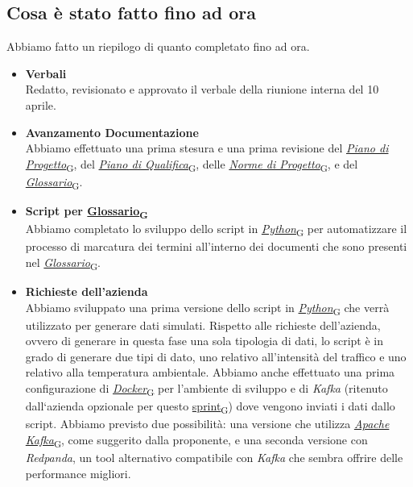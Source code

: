 \documentclass[italian,12pt]{article}
\begin{document}
\subsection{Cosa è stato fatto fino ad ora}
Abbiamo fatto un riepilogo di quanto completato fino ad ora.
\begin{itemize}
	\item \textbf{Verbali} \\
	Redatto, revisionato e approvato il verbale della riunione interna del 10 aprile.
	\item \textbf{Avanzamento Documentazione} \\
	Abbiamo effettuato una prima stesura e una prima revisione del \href{https://7last.github.io/docs/rtb/documentazione-interna/glossario\#piano-di-progetto}{\textit{Piano di Progetto}\textsubscript{G}}, del \href{https://7last.github.io/docs/rtb/documentazione-interna/glossario\#piano-di-qualifica}{\textit{Piano di Qualifica}\textsubscript{G}}, delle \href{https://7last.github.io/docs/rtb/documentazione-interna/glossario\#norme-di-progetto}{\textit{Norme di Progetto}\textsubscript{G}}, e del \href{https://7last.github.io/docs/rtb/documentazione-interna/glossario\#glossario}{\textit{Glossario}\textsubscript{G}}.
	\item \textbf{Script per \href{https://7last.github.io/docs/rtb/documentazione-interna/glossario\#glossario}{Glossario\textsubscript{G}}} \\
	Abbiamo completato lo sviluppo dello script in \href{https://7last.github.io/docs/rtb/documentazione-interna/glossario#python}{\textit{Python}\textsubscript{G}} per automatizzare il processo di marcatura dei termini all'interno dei documenti che sono presenti nel \href{https://7last.github.io/docs/rtb/documentazione-interna/glossario\#glossario}{\textit{Glossario}\textsubscript{G}}.
	\item \textbf{Richieste dell'azienda} \\
	Abbiamo sviluppato una prima versione dello script in \href{https://7last.github.io/docs/rtb/documentazione-interna/glossario#python}{\textit{Python}\textsubscript{G}} che verrà utilizzato per generare dati simulati. Rispetto alle richieste dell'azienda, ovvero di generare in questa fase una sola tipologia di dati, lo script è in grado di generare due tipi di dato, uno relativo all'intensità del traffico e uno relativo alla temperatura ambientale. Abbiamo anche effettuato una prima configurazione di \href{https://7last.github.io/docs/rtb/documentazione-interna/glossario#docker}{\textit{Docker}\textsubscript{G}} per l'ambiente di sviluppo e di \textit{Kafka} (ritenuto dall`azienda opzionale per questo \href{https://7last.github.io/docs/rtb/documentazione-interna/glossario#sprint}{sprint\textsubscript{G}}) dove vengono inviati i dati dallo script. Abbiamo previsto due possibilità: una versione che utilizza \href{https://7last.github.io/docs/rtb/documentazione-interna/glossario#apache-kafka}{\textit{Apache Kafka}\textsubscript{G}}, come suggerito dalla proponente, e una seconda versione con \textit{Redpanda}, un tool alternativo compatibile con \textit{Kafka} che sembra offrire delle performance migliori.
\end{itemize}
\end{document}
